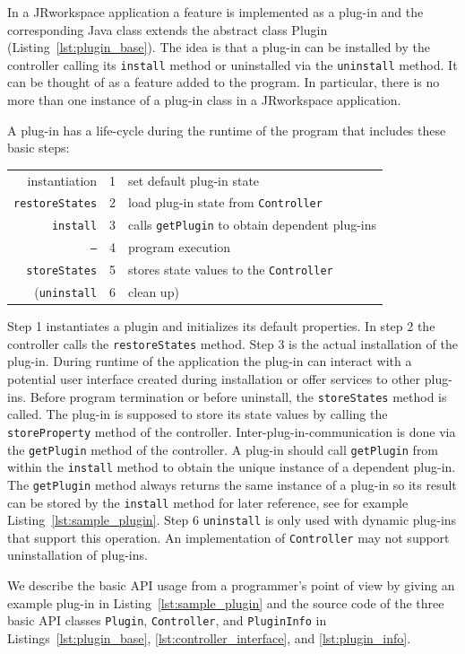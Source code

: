 \documentclass[Thesis.tex]{subfiles}
\begin{document}
In a {\sc JRworkspace} application a feature is implemented as a plug-in and the corresponding Java class 
extends the abstract class Plugin
(Listing~\ref{lst:plugin_base}). The idea is that a plug-in can be installed by the controller 
calling its {\tt install} method or uninstalled via the {\tt uninstall} method. It can be thought of 
as a feature added to the program. In particular, there is no more than one instance of a
plug-in class in a {\sc JRworkspace} application.

A plug-in has a life-cycle during the runtime of the program that includes these basic
steps:
\begin{center}
\begin{tabular}{r|r|l}
	instantiation & 1 & set default plug-in state\\
	{\tt restoreStates} & 2 & load plug-in state from {\tt Controller}\\
	{\tt install} & 3 & calls {\tt getPlugin} to obtain dependent plug-ins\\
	{\tt --}  & 4 & program execution\\
	{\tt storeStates} & 5 & stores state values to the {\tt Controller}\\
	({\tt uninstall} & 6 & clean up)
\end{tabular}
\end{center}
Step 1 instantiates a plugin and initializes its default properties. In step 2 the controller 
calls the {\tt restoreStates} method. Step 3 is the actual installation of the plug-in. 
During runtime
of the application the plug-in can interact with a potential user interface created during 
installation or offer services to other plug-ins. 
Before program termination or before uninstall, the {\tt storeStates} method is called. The plug-in
is supposed to store its state values by calling the {\tt storeProperty}
method of the controller.
Inter-plug-in-communication is done via the {\tt getPlugin} method of the controller. 
A plug-in should call {\tt getPlugin} from within the {\tt install} method to obtain the unique instance 
of a dependent plug-in. The {\tt getPlugin} method always returns the same instance of a plug-in so its
result can be stored by the {\tt install} method for later reference, see for example 
Listing~\ref{lst:sample_plugin}. Step 6 {\tt uninstall} is only used with dynamic plug-ins that support 
this operation. An implementation of {\tt Controller} may not support uninstallation of plug-ins.

We describe the basic API usage from a programmer's point of view by giving an example plug-in
in Listing~\ref{lst:sample_plugin} and the source code of the three basic API classes 
{\tt Plugin}, {\tt Controller}, and {\tt PluginInfo} in Listings~\ref{lst:plugin_base}, 
\ref{lst:controller_interface}, and \ref{lst:plugin_info}.
\end{document}
